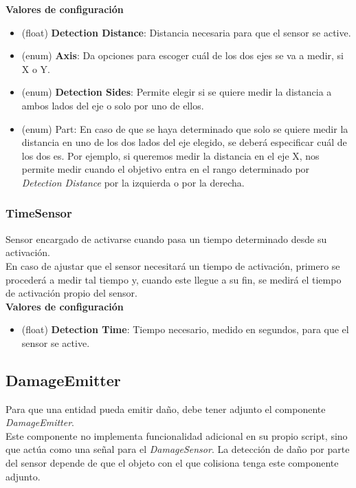 \begin{itemize}
\textbf{Valores de configuración}
	\begin{itemize}
	        \item (float) \textbf{Detection Distance}: Distancia necesaria para que el sensor se active.
	        \item (enum) \textbf{Axis}: Da opciones para escoger cuál de los dos ejes se va a medir, si X o Y.
	        \item (enum) \textbf{Detection Sides}: Permite elegir si se quiere medir la distancia a ambos lados del eje o solo por uno de ellos.
	        \item (enum) Part: En caso de que se haya determinado que solo se quiere medir la distancia en uno de los dos lados del eje elegido, se deberá especificar cuál de los dos es. Por ejemplo, si queremos medir la distancia en el eje X, nos permite medir cuando el objetivo entra en el rango determinado por \textit{Detection Distance} por la izquierda o por la derecha.
	 \end{itemize}
\end{itemize}

\subsubsection{TimeSensor}

Sensor encargado de activarse cuando pasa un tiempo determinado desde su activación.\\
En caso de ajustar que el sensor necesitará un tiempo de activación, primero se procederá a medir tal tiempo y, cuando este llegue a su fin, se medirá el tiempo de activación propio del sensor.\\

\textbf{Valores de configuración}
	\begin{itemize}
	        \item (float) \textbf{Detection Time}: Tiempo necesario, medido en segundos, para que el sensor se active.
	 \end{itemize}

\subsection{DamageEmitter}

Para que una entidad pueda emitir daño, debe tener adjunto el componente \textit{DamageEmitter}.\\
Este componente no implementa funcionalidad adicional en su propio script, sino que actúa como una señal para el \textit{DamageSensor}. La detección de daño por parte del sensor depende de que el objeto con el que colisiona tenga este componente adjunto.\\

